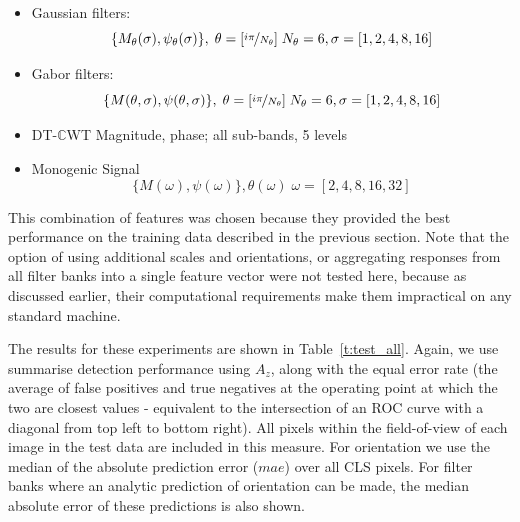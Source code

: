\documentclass{IEEEtran}
\newcommand{\tref}[1]{Table~\ref{#1}}
\def\dtcwt{DT-$\mathbb{C}$WT}
\begin{document}
\begin{itemize}
  \item Gaussian filters:
  \begin{equation*}
    \{ M_\theta(\sigma), \psi_\theta(\sigma) \}, \; \theta = [ \nicefrac{i\pi}{N_\theta} ] \; N_\theta = 6, \sigma = [1,2,4,8,16]
  \end{equation*}


  \item Gabor filters:
  \begin{equation*}
    \{ M(\theta,\sigma), \psi(\theta,\sigma) \}, \; \theta = [ \nicefrac{i\pi}{N_\theta} ] \; N_\theta = 6, \sigma = [1,2,4,8,16]
  \end{equation*}

  \item \dtcwt{}
    Magnitude, phase; all sub-bands, 5 levels

  \item Monogenic Signal
  \begin{equation*}
    \{ M(\omega), \psi(\omega) \}, \theta(\omega) \; \omega = [2,4,8,16,32]
  \end{equation*}

\end{itemize}

This combination of features was chosen because they provided the best performance on the training data described in the previous section. Note that the option of using additional scales and orientations, or aggregating responses from all filter banks into a single feature vector were not tested here, because as discussed earlier, their computational requirements make them impractical on any standard machine.

The results for these experiments are shown in \tref{t:test_all}. Again, we use summarise detection performance using $A_z$, along with the equal error rate (the average of false positives and true negatives at the operating point at which the two are closest values - equivalent to the intersection of an ROC curve with a diagonal from top left to bottom right). All pixels within the field-of-view of each image in the test data are included in this measure. For orientation we use the median of the absolute prediction error ($mae$) over all CLS pixels. For filter banks where an analytic prediction of orientation can be made, the median absolute error of these predictions is also shown.
\end{document}
